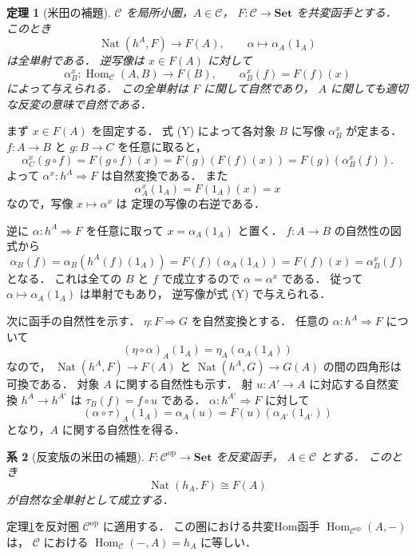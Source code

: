 \documentclass[a5paper,10pt,onecolumn]{jsarticle}
\makeatletter
\theoremstyle{mathnotetheorem}
\newtheorem{theorem}{定理}[section]
\newtheorem{corollary}[theorem]{系}
\renewcommand{\proofname}{証明}
\renewenvironment{proof}[1][\proofname]{%
  \par\pushQED{\qed}\normalfont\topsep4\p@\@plus2\p@\relax
  \trivlist\item[\hskip\labelsep\bfseries #1]\ignorespaces
}{\popQED\endtrivlist\@endpefalse}
\makeatother
\begin{document}
\begin{theorem}[米田の補題]\label{thm:yoneda}
$\mathcal C$ を局所小圏，$A\in\mathcal C$，
$F:\mathcal C\to\mathbf{Set}$ を共変函手とする．
このとき
\[
 \operatorname{Nat}(h^A,F)\longrightarrow F(A),
 \qquad \alpha\longmapsto\alpha_A(1_A)
\]
は全単射である．
逆写像は $x\in F(A)$ に対して
\[
 \alpha^x_B:
 \operatorname{Hom}_{\mathcal C}(A,B)\to F(B),
 \qquad
 \alpha^x_B(f)=F(f)(x)
 \tag{Y}
\]
によって与えられる．
この全単射は $F$ に関して自然であり，
$A$ に関しても適切な反変の意味で自然である．
\end{theorem}
\begin{proof}
まず $x\in F(A)$ を固定する．
式 (Y) によって各対象 $B$ に写像 $\alpha^x_B$ が定まる．
$f:A\to B$ と $g:B\to C$ を任意に取ると，
\[
 \alpha^x_C(g\circ f)
 =F(g\circ f)(x)
 =F(g)(F(f)(x))
 =F(g)(\alpha^x_B(f)).
\]
よって $\alpha^x:h^A\Rightarrow F$ は自然変換である．
また
\[
 \alpha^x_A(1_A)=F(1_A)(x)=x
\]
なので，写像 $x\mapsto\alpha^x$ は
定理の写像の右逆である．

逆に $\alpha:h^A\Rightarrow F$ を任意に取って
$x=\alpha_A(1_A)$ と置く．
$f:A\to B$ の自然性の図式から
\[
 \alpha_B(f)
 =\alpha_B(h^A(f)(1_A))
 =F(f)(\alpha_A(1_A))
 =F(f)(x)
 =\alpha^x_B(f)
\]
となる．
これは全ての $B$ と $f$ で成立するので
$\alpha=\alpha^x$ である．
従って $\alpha\mapsto\alpha_A(1_A)$ は単射でもあり，
逆写像が式 (Y) で与えられる．

次に函手の自然性を示す．
$\eta:F\Rightarrow G$ を自然変換とする．
任意の $\alpha:h^A\Rightarrow F$ について
\[
 (\eta\circ\alpha)_A(1_A)
 =\eta_A(\alpha_A(1_A))
\]
なので，
$\operatorname{Nat}(h^A,F)\to F(A)$ と
$\operatorname{Nat}(h^A,G)\to G(A)$ の間の四角形は
可換である．
対象 $A$ に関する自然性も示す．
射 $u:A'\to A$ に対応する自然変換
$h^A\to h^{A'}$ は
$\tau_B(f)=f\circ u$ である．
$\alpha:h^{A'}\Rightarrow F$ に対して
\[
 (\alpha\circ\tau)_A(1_A)
 =\alpha_A(u)
 =F(u)(\alpha_{A'}(1_{A'}))
\]
となり，$A$ に関する自然性を得る．
\end{proof}

\begin{corollary}[反変版の米田の補題]\label{cor:yoneda-contra}
$F:\mathcal C^{\mathrm{op}}\to\mathbf{Set}$ を反変函手，
$A\in\mathcal C$ とする．
このとき
\[
 \operatorname{Nat}(h_A,F)\cong F(A)
\]
が自然な全単射として成立する．
\end{corollary}
\begin{proof}
定理\ref{thm:yoneda}を反対圏
$\mathcal C^{\mathrm{op}}$ に適用する．
この圏における共変Hom函手
$\operatorname{Hom}_{\mathcal C^{\mathrm{op}}}(A,-)$ は，
$\mathcal C$ における
$\operatorname{Hom}_{\mathcal C}(-,A)=h_A$ に等しい．
\end{proof}
\end{document}
